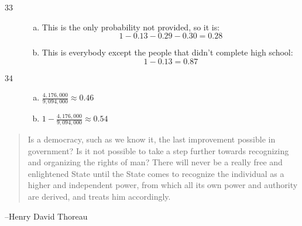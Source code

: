 \documentclass[letterpaper, landscape]{exam}
\begin{document}
\begin{description}
      \item[33]
        \begin{enumerate}[(a)]
          \item This is the only probability not provided, so it is:
            \[
              1 - 0.13 - 0.29 - 0.30 = \boxed{ 0.28 }
            \]

          \item This is everybody except the people that didn't complete high
            school:
            \[
              1 - 0.13 = \boxed{ 0.87 }
            \]
        \end{enumerate}

      \item[34]
        \begin{enumerate}[(a)]
          \item $\frac{4,176,000}{9,094,000} \approx 0.46$
          \item $1 - \frac{4,176,000}{9,094,000} \approx 0.54$
        \end{enumerate}

  \end{description}

  \else
    \vspace{10 cm}
    \begin{quote}
      \begin{em}
        Is a democracy, such as we know it, the last improvement possible in
        government? Is it not possible to take a step further towards
        recognizing and organizing the rights of man? There will never be a
        really free and enlightened State until the State comes to recognize the
        individual as a higher and independent power, from which all its own
        power and authority are derived, and treats him accordingly. 
      \end{em}
    \end{quote}
    \hspace{1 cm} --Henry David Thoreau
  \fi
\end{document}
